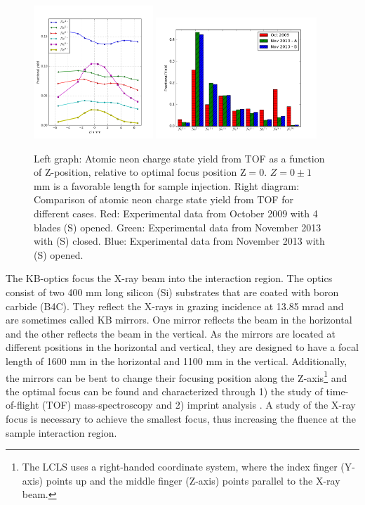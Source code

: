 \begin{figure}
	\centering
		\includegraphics[width=0.40\textwidth]{images/Focus-z-scan.png}
		\includegraphics[width=0.54\textwidth]{images/Focus-Fractional-Yield.png}
	\caption[Focal spot analysis using a time-of-flight ion spectrometer.]{Left graph: Atomic neon charge state yield from TOF as a function of Z-position, relative to optimal focus position $\text{Z}=0$. $Z=0\pm1$ mm is a favorable length for sample injection. Right diagram: Comparison of atomic neon charge state yield from TOF for different cases. Red: Experimental data from October 2009 with 4 blades (S) opened. Green: Experimental data from November 2013 with (S) closed. Blue: Experimental data from November 2013 with (S) opened.}
	\label{fig:Focus-z-scan}
\end{figure}
The KB-optics focus the X-ray beam into the interaction region. The optics consist of two 400 mm long silicon (Si) substrates that are coated with boron carbide (B4C). They reflect the X-rays in grazing incidence at 13.85 mrad and are sometimes called KB mirrors. One mirror reflects the beam in the horizontal and the other reflects the beam in the vertical. As the mirrors are located at different positions in the horizontal and vertical, they are designed to have a focal length of 1600 mm in the horizontal and 1100 mm in the vertical. Additionally, the mirrors can be bent to change their focusing position along the Z-axis\footnote{The LCLS uses a right-handed coordinate system, where the index finger (Y-axis) points up and the middle finger (Z-axis) points parallel to the X-ray beam.} and the optimal focus can be found and characterized through 1) the study of time-of-flight (TOF) mass-spectroscopy \citep{Bucher-2016-Unpublished} and 2) imprint analysis \citep{Hajkova-2011-SPIE,Chalupsky-2011-NIMPR}. A study of the X-ray focus is necessary to achieve the smallest focus, thus increasing the fluence at the sample interaction region.
%
%
%
